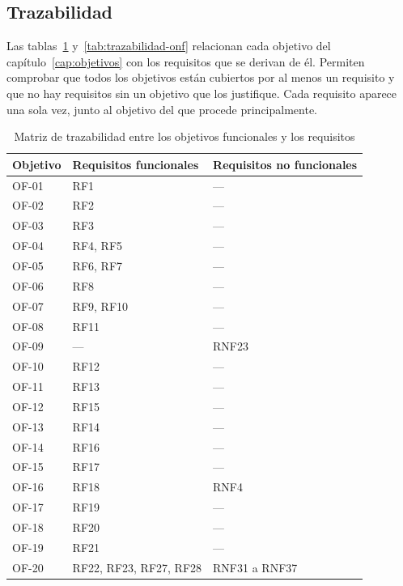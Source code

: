 \subsection*{Trazabilidad}

Las tablas~\ref{tab:trazabilidad-of} y~\ref{tab:trazabilidad-onf} relacionan cada objetivo del capítulo~\ref{cap:objetivos} con los requisitos que se derivan de él. Permiten comprobar que todos los objetivos están cubiertos por al menos un requisito y que no hay requisitos sin un objetivo que los justifique. Cada requisito aparece una sola vez, junto al objetivo del que procede principalmente.

{\renewcommand{\arraystretch}{1.4}
\small
\begin{longtable}{|p{2.9cm}|>{\raggedright\arraybackslash}p{5.2cm}|>{\raggedright\arraybackslash}p{5.2cm}|}
	\hline
	\textbf{Objetivo} & \textbf{Requisitos funcionales} & \textbf{Requisitos no funcionales} \\
	\hline
	\endhead
	\caption{Matriz de trazabilidad entre los objetivos funcionales y los requisitos}
	\label{tab:trazabilidad-of}
	\endlastfoot
	OF-01 & RF1 & --- \\
	\hline
	OF-02 & RF2 & --- \\
	\hline
	OF-03 & RF3 & --- \\
	\hline
	OF-04 & RF4, RF5 & --- \\
	\hline
	OF-05 & RF6, RF7 & --- \\
	\hline
	OF-06 & RF8 & --- \\
	\hline
	OF-07 & RF9, RF10 & --- \\
	\hline
	OF-08 & RF11 & --- \\
	\hline
	OF-09 & --- & RNF23 \\
	\hline
	OF-10 & RF12 & --- \\
	\hline
	OF-11 & RF13 & --- \\
	\hline
	OF-12 & RF15 & --- \\
	\hline
	OF-13 & RF14 & --- \\
	\hline
	OF-14 & RF16 & --- \\
	\hline
	OF-15 & RF17 & --- \\
	\hline
	OF-16 & RF18 & RNF4 \\
	\hline
	OF-17 & RF19 & --- \\
	\hline
	OF-18 & RF20 & --- \\
	\hline
	OF-19 & RF21 & --- \\
	\hline
	OF-20 & RF22, RF23, RF27, RF28 & RNF31 a RNF37 \\

\end{longtable}}

